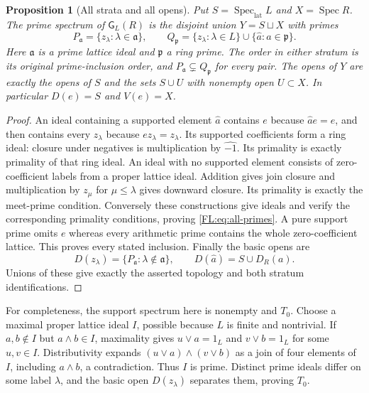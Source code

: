 \documentclass[11pt,a4paper]{article}
\newtheorem{proposition}[theorem]{Proposition}
\theoremstyle{definition}\newtheorem{definition}[theorem]{Definition}
\newcommand{\Spec}{\operatorname{Spec}}\newcommand{\SpecMon}{\operatorname{Spec}_{\mathrm{mon}}}
\newcommand{\SpecLat}{\operatorname{Spec}_{\mathrm{lat}}}
\newcommand{\G}{\mathsf G}\newcommand{\Tor}{\operatorname{Tor}}\newcommand{\Frac}{\operatorname{Frac}}
\begin{document}
\begin{proposition}[All strata and all opens]\label{FL:prop:ordinal-spectrum}
Put $S=\SpecLat L$ and $X=\Spec R$. The prime spectrum of
$\G_L(R)$ is the disjoint union $Y=S\sqcup X$ with primes
\[
 P_{\mathfrak a}=\{z_\lambda:\lambda\in\mathfrak a\},\qquad
 Q_{\mathfrak p}=\{z_\lambda:\lambda\in L\}
                   \cup\{\widehat a:a\in\mathfrak p\}.
 \tag{FL3}\label{FL:eq:all-primes}
\]
Here $\mathfrak a$ is a prime lattice ideal and $\mathfrak p$ a ring
prime. The order in either stratum is its original prime-inclusion
order, and $P_{\mathfrak a}\subsetneq Q_{\mathfrak p}$ for every pair.
The opens of $Y$ are exactly the opens of $S$ and the sets
$S\cup U$ with nonempty open $U\subset X$. In particular
$D(e)=S$ and $V(e)=X$.
\end{proposition}
\begin{proof}
An ideal containing a supported element $\widehat a$ contains $e$
because $\widehat a e=e$, and then contains every $z_\lambda$ because
$ez_\lambda=z_\lambda$. Its supported coefficients form a ring ideal:
closure under negatives is multiplication by $\widehat{-1}$. Its
primality is exactly primality of that ring ideal. An ideal with no
supported element consists of zero-coefficient labels from a proper
lattice ideal. Addition gives join closure and multiplication by
$z_\mu$ for $\mu\le\lambda$ gives downward closure. Its primality is
exactly the meet-prime condition. Conversely these constructions give
ideals and verify the corresponding primality conditions, proving
\eqref{FL:eq:all-primes}. A pure support prime omits $e$ whereas every
arithmetic prime contains the whole zero-coefficient lattice. This
proves every stated inclusion. Finally the basic opens are
\[
 D(z_\lambda)=\{P_{\mathfrak a}:\lambda\notin\mathfrak a\},\qquad
 D(\widehat a)=S\cup D_R(a).
 \tag{FL4}\label{FL:eq:basic-opens}
\]
Unions of these give exactly the asserted topology and both stratum
identifications.
\end{proof}

For completeness, the support spectrum here is nonempty and $T_0$.
Choose a maximal proper lattice ideal $I$, possible because $L$ is
finite and nontrivial. If $a,b\notin I$ but $a\wedge b\in I$,
maximality gives $u\vee a=1_L$ and $v\vee b=1_L$ for some $u,v\in I$.
Distributivity expands $(u\vee a)\wedge(v\vee b)$ as a join of four
elements of $I$, including $a\wedge b$, a contradiction. Thus $I$
is prime. Distinct prime ideals differ on some label $\lambda$, and
the basic open $D(z_\lambda)$ separates them, proving $T_0$.
\end{document}
